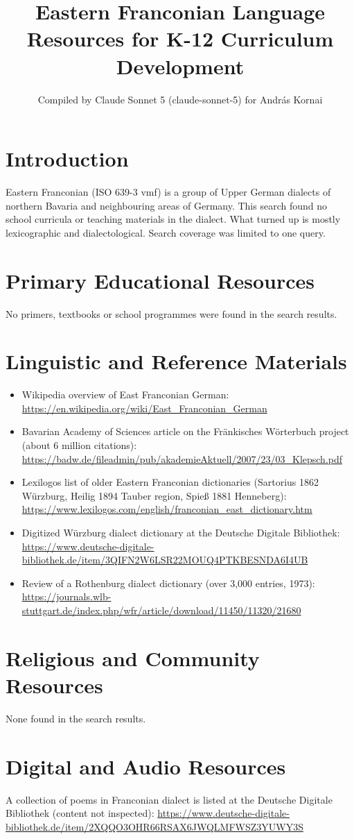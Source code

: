 \documentclass[12pt]{article}
\title{Eastern Franconian Language Resources for K-12 Curriculum Development}
\author{Compiled by Claude Sonnet 5 (claude-sonnet-5) for Andr\'as Kornai}
\date{}
\begin{document}
\maketitle
\section{Introduction}
Eastern Franconian (ISO 639-3 vmf) is a group of Upper German dialects of northern Bavaria and neighbouring areas of Germany. This search found no school curricula or teaching materials in the dialect. What turned up is mostly lexicographic and dialectological. Search coverage was limited to one query.
\section{Primary Educational Resources}
No primers, textbooks or school programmes were found in the search results.
\section{Linguistic and Reference Materials}
\begin{itemize}
\item Wikipedia overview of East Franconian German: \url{https://en.wikipedia.org/wiki/East_Franconian_German}
\item Bavarian Academy of Sciences article on the Fr\"ankisches W\"orterbuch project (about 6 million citations): \url{https://badw.de/fileadmin/pub/akademieAktuell/2007/23/03_Klepsch.pdf}
\item Lexilogos list of older Eastern Franconian dictionaries (Sartorius 1862 Würzburg, Heilig 1894 Tauber region, Spie{\ss} 1881 Henneberg): \url{https://www.lexilogos.com/english/franconian_east_dictionary.htm}
\item Digitized Würzburg dialect dictionary at the Deutsche Digitale Bibliothek: \url{https://www.deutsche-digitale-bibliothek.de/item/3QIFN2W6LSR22MOUQ4PTKBESNDA6I4UB}
\item Review of a Rothenburg dialect dictionary (over 3,000 entries, 1973): \url{https://journals.wlb-stuttgart.de/index.php/wfr/article/download/11450/11320/21680}
\end{itemize}
\section{Religious and Community Resources}
None found in the search results.
\section{Digital and Audio Resources}
A collection of poems in Franconian dialect is listed at the Deutsche Digitale Bibliothek (content not inspected): \url{https://www.deutsche-digitale-bibliothek.de/item/2XQQO3OHR66RSAX6JWQLMFWSZ3YUWY3S}
\end{document}

